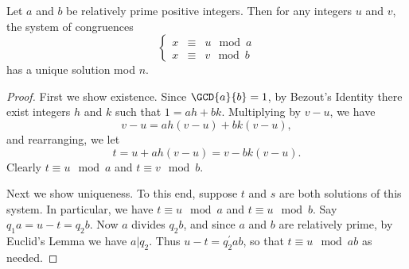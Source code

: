 \documentclass{article}
\begin{document}
\begin{thm}
Let $a$ and $b$ be relatively prime positive integers. Then for any integers $u$ and $v$, the system of congruences \[ \left\{ \begin{array}{rcl} x & \equiv & u \mod a \\ x & \equiv & v \mod b \end{array} \right. \] has a unique solution mod $n$.
\end{thm}

\begin{proof}
First we show existence. Since $\GCD{a}{b} = 1$, by Bezout's Identity there exist integers $h$ and $k$ such that $1 = ah + bk$. Multiplying by $v-u$, we have \[ v-u = ah(v-u) + bk(v-u), \] and rearranging, we let \[ t = u + ah(v-u) = v - bk(v-u). \] Clearly $t \equiv u \mod a$ and $t \equiv v \mod b$.

Next we show uniqueness. To this end, suppose $t$ and $s$ are both solutions of this system. In particular, we have $t \equiv u \mod a$ and $t \equiv u \mod b$. Say $q_1a = u - t = q_2b$. Now $a$ divides $q_2b$, and since $a$ and $b$ are relatively prime, by Euclid's Lemma we have $a|q_2$. Thus $u-t = q_2^\prime ab$, so that $t \equiv u \mod ab$ as needed.
\end{proof}
\end{document}
